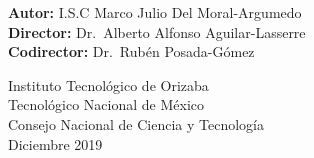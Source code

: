 \begin{titlepage}
\begin{center}
        \vspace*{0.7cm}
        \textbf{Autor:} I.S.C Marco Julio Del Moral-Argumedo \\
        \textbf{Director:} Dr.\ Alberto Alfonso Aguilar-Lasserre \\
        \textbf{Codirector:} Dr.\ Rubén Posada-Gómez
        \vspace*{0.7cm}
        
        \large
        Instituto Tecnológico de Orizaba\\
        Tecnológico Nacional de México\\
        Consejo Nacional de Ciencia y Tecnología\\
        \normalsize
        Diciembre 2019
        
    \end{center}
\end{titlepage}